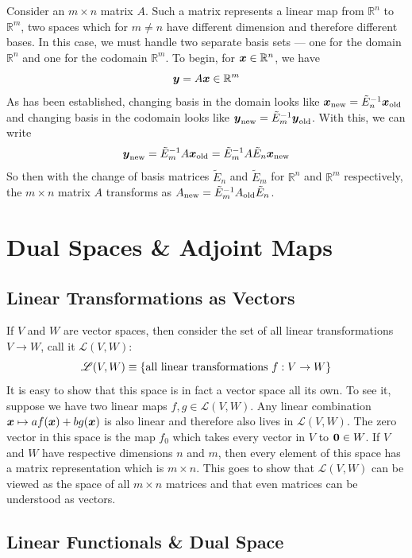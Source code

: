 \documentclass[onecolumn]{gwclass}
\begin{document}
Consider an $m\times n$ matrix $A$. Such a matrix represents a linear map from $\mathbb{R}^n$ to $\mathbb{R}^m$, two spaces which for $m\neq n$ have different dimension and therefore different bases. In this case, we must handle two separate basis sets --- one for the domain $\mathbb{R}^n$ and one for the codomain $\mathbb{R}^m$. To begin, for $\boldsymbol{x}\in\mathbb{R}^n$, we have
$$ \boldsymbol{y} = A\boldsymbol{x} \in \mathbb{R}^m $$
As has been established, changing basis in the domain  looks like $\boldsymbol{x}_{\text{\normalfont{new}}}= \tilde{E}_n^{-1}\boldsymbol{x}_{\text{\normalfont{old}}}$ and changing basis in the codomain looks like $\boldsymbol{y}_{\text{\normalfont{new}}}=\tilde{E}_m^{-1}\boldsymbol{y}_{\text{\normalfont{old}}}$. With this, we can write
$$ \boldsymbol{y}_{\text{\normalfont{new}}}=\tilde{E}_m^{-1}A\boldsymbol{x}_{\text{\normalfont{old}}} = \tilde{E}_m^{-1}A\tilde{E}_n\boldsymbol{x}_{\text{\normalfont{new}}} $$
So then with the change of basis matrices $\tilde{E}_n$ and $\tilde{E}_m$ for $\mathbb{R}^n$ and $\mathbb{R}^m$ respectively, the $m\times n$ matrix $A$ transforms as $A_{\text{\normalfont{new}}} = \tilde{E}_m^{-1}A_{\text{\normalfont{old}}}\tilde{E}_n$.
 
 

\section{Dual Spaces \& Adjoint Maps}

\subsection{Linear Transformations as Vectors}

If $V$ and $W$ are vector spaces, then consider the set of all linear transformations $V\to W$, call it $\mathscr{L}(V,W)$:
$$ \mathscr{L}(V,W) \equiv \{ \text{\normalfont{all linear transformations }} f:V\to W \} $$
It is easy to show that this space is in fact a vector space all its own. To see it, suppose we have two linear maps $f,g\in\mathscr{L}(V,W)$. Any linear combination $\boldsymbol{x}\mapsto af(\boldsymbol{x}) + bg(\boldsymbol{x})$ is also linear and therefore also lives in $\mathscr{L}(V,W)$. The zero vector in this space is the map $f_0$ which takes every vector in $V$ to $\boldsymbol{0}\in W$. If $V$ and $W$ have respective dimensions $n$ and $m$, then every element of this space has a matrix representation which is $m\times n$. This goes to show that $\mathscr{L}(V,W)$ can be viewed as the space of all $m\times n$ matrices and that even matrices can be understood as vectors.

\subsection{Linear Functionals \& Dual Space}
\end{document}
